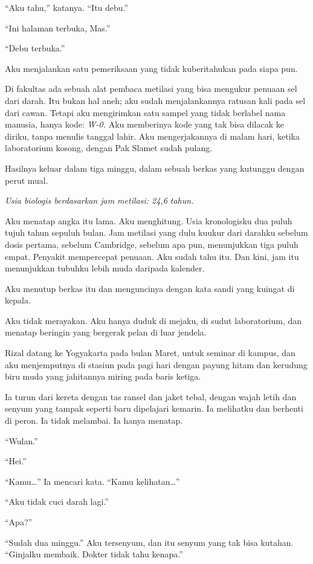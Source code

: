 \documentclass[11pt,twoside,openany]{book}
\makeatletter
\newcommand{\scenebreak}{\par\vspace{0.9em}{\centering\textsc{*\hspace{0.7em}*\hspace{0.7em}*}\par}\vspace{0.9em}\@afterindentfalse\@afterheading}
\makeatother
\begin{document}
``Aku tahu,'' katanya. ``Itu debu.''

``Ini halaman terbuka, Mas.''

``Debu terbuka.''

\scenebreak
Aku menjalankan satu pemeriksaan yang tidak kuberitahukan pada siapa pun.

Di fakultas ada sebuah alat pembaca metilasi yang bisa mengukur penuaan sel dari darah. Itu bukan hal aneh; aku sudah menjalankannya ratusan kali pada sel dari cawan. Tetapi aku mengirimkan satu sampel yang tidak berlabel nama manusia, hanya kode: \emph{W-0.} Aku memberinya kode yang tak bisa dilacak ke diriku, tanpa menulis tanggal lahir. Aku mengerjakannya di malam hari, ketika laboratorium kosong, dengan Pak Slamet sudah pulang.

Hasilnya keluar dalam tiga minggu, dalam sebuah berkas yang kutunggu dengan perut mual.

\emph{Usia biologis berdasarkan jam metilasi: 24,6 tahun.}

Aku menatap angka itu lama. Aku menghitung. Usia kronologisku dua puluh tujuh tahun sepuluh bulan. Jam metilasi yang dulu kuukur dari darahku sebelum dosis pertama, sebelum Cambridge, sebelum apa pun, menunjukkan tiga puluh empat. Penyakit mempercepat penuaan. Aku sudah tahu itu. Dan kini, jam itu menunjukkan tubuhku lebih muda daripada kalender.

Aku menutup berkas itu dan menguncinya dengan kata sandi yang kuingat di kepala.

Aku tidak merayakan. Aku hanya duduk di mejaku, di sudut laboratorium, dan menatap beringin yang bergerak pelan di luar jendela.

\scenebreak
Rizal datang ke Yogyakarta pada bulan Maret, untuk seminar di kampus, dan aku menjemputnya di stasiun pada pagi hari dengan payung hitam dan kerudung biru muda yang jahitannya miring pada baris ketiga.

Ia turun dari kereta dengan tas ransel dan jaket tebal, dengan wajah letih dan senyum yang tampak seperti baru dipelajari kemarin. Ia melihatku dan berhenti di peron. Ia tidak melambai. Ia hanya menatap.

``Wulan.''

``Hei.''

``Kamu\ldots{}'' Ia mencari kata. ``Kamu kelihatan\ldots{}''

``Aku tidak cuci darah lagi.''

``Apa?''

``Sudah dua minggu.'' Aku tersenyum, dan itu senyum yang tak bisa kutahan. ``Ginjalku membaik. Dokter tidak tahu kenapa.''
\end{document}
